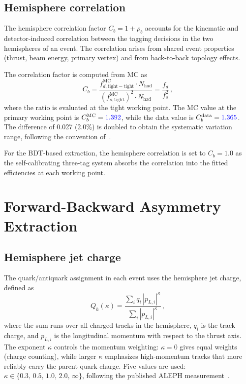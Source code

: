 \documentclass[11pt,a4paper]{article}
\newcommand{\measured}[1]{\textcolor{blue}{#1}}
\begin{document}
\subsection{Hemisphere correlation}
\label{sec:hemisphere-corr}

The hemisphere correlation factor $C_b = 1 + \rho_b$ accounts for the
kinematic and detector-induced correlation between the tagging decisions
in the two hemispheres of an event.  The correlation arises from shared
event properties (thrust, beam energy, primary vertex) and from
back-to-back topology effects.

The correlation factor is computed from MC as
\begin{equation}
  C_b = \frac{f_{d,\mathrm{tight-tight}}^\mathrm{MC} \cdot N_\mathrm{had}}
       {(f_{s,\mathrm{tight}}^\mathrm{MC})^2 \cdot N_\mathrm{had}}
     = \frac{f_d}{f_s^2}\,,
  \label{eq:cb}
\end{equation}
where the ratio is evaluated at the tight working point.  The MC value
at the primary working point is $C_b^\mathrm{MC} = \measured{1.392}$,
while the data value is $C_b^\mathrm{data} = \measured{1.365}$.  The
difference of 0.027 (2.0\%) is doubled to obtain the systematic variation
range, following the convention of~\cite{ALEPH:Rb:1996}.

For the BDT-based extraction, the hemisphere correlation is set to
$C_b = 1.0$ as the self-calibrating three-tag system absorbs the
correlation into the fitted efficiencies at each working point.

\section{Forward-Backward Asymmetry Extraction}
\label{sec:afb-method}

\subsection{Hemisphere jet charge}
\label{sec:jet-charge}

The quark/antiquark assignment in each event uses the hemisphere jet
charge, defined as
\begin{equation}
  Q_h(\kappa) = \frac{\sum_i q_i\, |p_{L,i}|^\kappa}
                     {\sum_i |p_{L,i}|^\kappa}\,,
  \label{eq:jet-charge}
\end{equation}
where the sum runs over all charged tracks in the hemisphere, $q_i$ is
the track charge, and $p_{L,i}$ is the longitudinal momentum with respect
to the thrust axis.  The exponent $\kappa$ controls the momentum
weighting: $\kappa = 0$ gives equal weights (charge counting), while
larger $\kappa$ emphasizes high-momentum tracks that more reliably carry
the parent quark charge.  Five values are used:
$\kappa \in \{0.3,\, 0.5,\, 1.0,\, 2.0,\, \infty\}$, following the
published ALEPH measurement~\cite{ALEPH:AFBb}.
\end{document}
